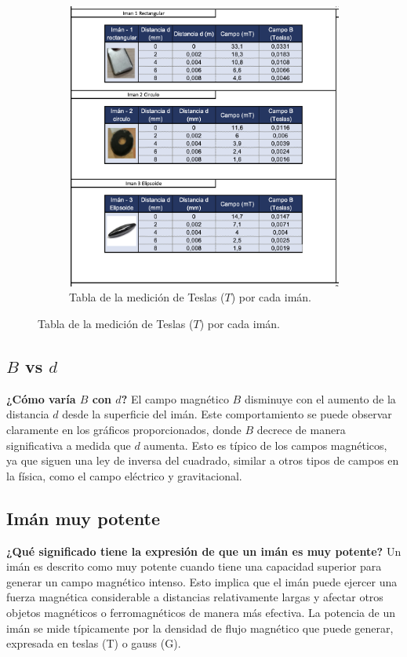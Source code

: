 \begin{figure}[H]
    \centering
    \begin{subfigure}[b]{\textwidth}
        \centering
        \includegraphics[width=\textwidth]{Figures/1. Content/TablaImanesTesla.png}
        \caption{Tabla de la medición de Teslas ($T$) por cada imán.}
        \label{fig: Tabla de geometria teslametro}
    \end{subfigure}
    \hfill
\end{figure}

\subsection{$B$ vs $d$}
\textbf{¿Cómo varía $B$ con $d$?}
El campo magnético $B$ disminuye con el aumento de la distancia $d$ desde la superficie del imán. Este comportamiento se puede observar claramente en los gráficos proporcionados, donde $B$ decrece de manera significativa a medida que $d$ aumenta. Esto es típico de los campos magnéticos, ya que siguen una ley de inversa del cuadrado, similar a otros tipos de campos en la física, como el campo eléctrico y gravitacional.

\subsection{Imán muy potente}
\textbf{¿Qué significado tiene la expresión de que un imán es muy potente?}
Un imán es descrito como muy potente cuando tiene una capacidad superior para generar un campo magnético intenso. Esto implica que el imán puede ejercer una fuerza magnética considerable a distancias relativamente largas y afectar otros objetos magnéticos o ferromagnéticos de manera más efectiva. La potencia de un imán se mide típicamente por la densidad de flujo magnético que puede generar, expresada en teslas (T) o gauss (G).

